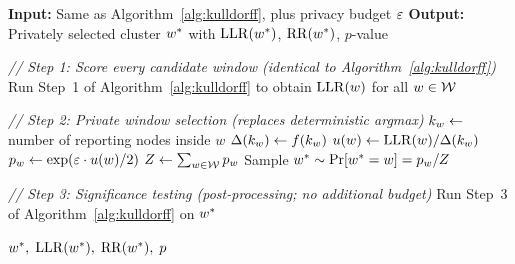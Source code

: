 
\begin{algorithm}[H]
\caption{Private Prospective Scan Statistic (Theorem~\ref{thm:mechanism})}
\label{alg:private}
\begin{algorithmic}[1]

\Statex \textbf{Input:}
  Same as Algorithm~\ref{alg:kulldorff}, plus privacy budget $\varepsilon$
\Statex \textbf{Output:}
  Privately selected cluster $w^*$ with $\mathrm{LLR}(w^*)$, $\mathrm{RR}(w^*)$, $p$-value

\Statex
\Statex \textit{// Step 1: Score every candidate window (identical to Algorithm~\ref{alg:kulldorff})}
\State Run Step~1 of Algorithm~\ref{alg:kulldorff} to obtain $\mathrm{LLR}(w)$ for all $w \in \mathcal{W}$

\Statex
\Statex \textit{// Step 2: Private window selection (replaces deterministic argmax)}
    \State $k_w \gets$ number of reporting nodes inside $w$
    \State $\Delta(k_w) \gets f(k_w)$
    \State $u(w) \gets \mathrm{LLR}(w) / \Delta(k_w)$
    \State $p_w \gets \exp\!\left(\varepsilon \cdot u(w) / 2\right)$
\EndFor
\State $Z \gets \sum_{w \in \mathcal{W}} p_w$
\State Sample $w^* \sim \Pr[w^* = w] = p_w / Z$

\Statex
\Statex \textit{// Step 3: Significance testing (post-processing; no additional budget)}
\State Run Step~3 of Algorithm~\ref{alg:kulldorff} on $w^*$

\State \Return $w^*,\; \mathrm{LLR}(w^*),\; \mathrm{RR}(w^*),\; p$

\end{algorithmic}
\end{algorithm}
